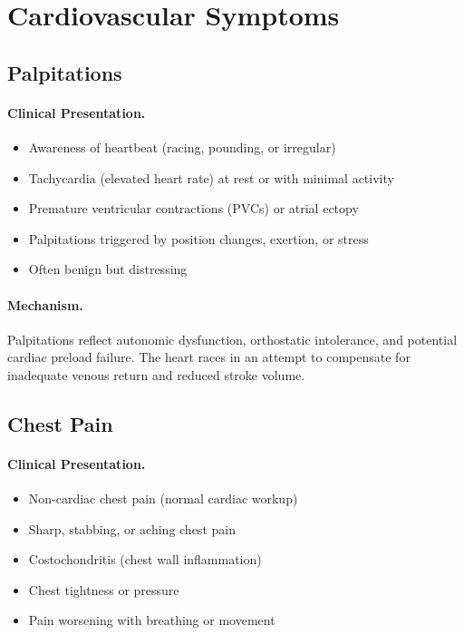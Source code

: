 \section{Cardiovascular Symptoms}
\label{sec:cardiac-symptoms}

\subsection{Palpitations}
\label{subsec:palpitations}

\paragraph{Clinical Presentation.}
\begin{itemize}
    \item Awareness of heartbeat (racing, pounding, or irregular)
    \item Tachycardia (elevated heart rate) at rest or with minimal activity
    \item Premature ventricular contractions (PVCs) or atrial ectopy
    \item Palpitations triggered by position changes, exertion, or stress
    \item Often benign but distressing
\end{itemize}

\paragraph{Mechanism.}
Palpitations reflect autonomic dysfunction, orthostatic intolerance, and potential cardiac preload failure. The heart races in an attempt to compensate for inadequate venous return and reduced stroke volume.

\subsection{Chest Pain}
\label{subsec:chest-pain}

\paragraph{Clinical Presentation.}
\begin{itemize}
    \item Non-cardiac chest pain (normal cardiac workup)
    \item Sharp, stabbing, or aching chest pain
    \item Costochondritis (chest wall inflammation)
    \item Chest tightness or pressure
    \item Pain worsening with breathing or movement
\end{itemize}

